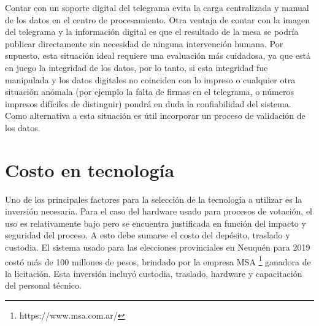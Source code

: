 Contar con un soporte digital del telegrama evita la carga centralizada y manual de los datos en el centro de procesamiento. Otra ventaja de contar con la imagen del telegrama y la información digital es que el resultado de la mesa se podría publicar directamente sin necesidad de ninguna intervención humana. Por supuesto, esta situación ideal requiere una evaluación más cuidadosa, ya que está en juego la integridad de los datos, por lo tanto, si esta integridad fue manipulada y los datos digitales no coinciden con lo impreso o cualquier otra situación anómala (por ejemplo la falta de firmas en el telegrama, o números impresos difíciles de distinguir) pondrá en duda la confiabilidad del sistema. Como alternativa a esta situación es útil incorporar un proceso de validación de los datos.


\section{Costo en tecnología}
Uno de los principales factores para la selección de la tecnología a utilizar es la inversión necesaria. Para el caso del hardware usado para procesos de votación, el uso es relativamente bajo pero se encuentra justificada en función del impacto y seguridad del proceso. A esto debe sumarse el costo del depósito, traslado y custodia. \newline
El sistema usado para las elecciones provinciales en Neuquén para 2019 costó más de 100 millones de pesos, brindado por la empresa MSA \footnote{https://www.msa.com.ar/} ganadora de la licitación. Esta inversión incluyó custodia, traslado, hardware y capacitación del personal técnico.\cite{eleccionesNeuquen}

